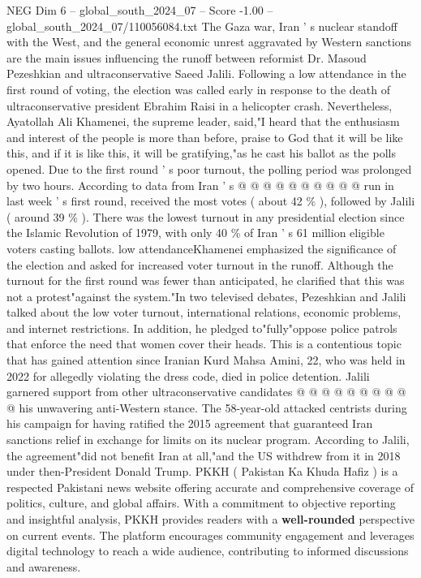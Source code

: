 \begin{textsample}{NEG Dim 6 – global\_south\_2024\_07 – Score -1.00 – global\_south\_2024\_07/110056084.txt}
The Gaza war, Iran ' s nuclear standoff with the West, and the general economic unrest aggravated by Western sanctions are the main issues influencing the runoff between reformist Dr.
Masoud Pezeshkian and ultraconservative Saeed Jalili.
Following a low attendance in the first round of voting, the election was called early in response to the death of ultraconservative president Ebrahim Raisi in a helicopter crash.
Nevertheless, Ayatollah Ali Khamenei, the supreme leader, said,"I heard that the enthusiasm and interest of the people is more than before, praise to God that it will be like this, and if it is like this, it will be gratifying,"as he cast his ballot as the polls opened.
Due to the first round ' s poor turnout, the polling period was prolonged by two hours.
According to data from Iran ' s @ @ @ @ @ @ @ @ @ @ run in last week ' s first round, received the most votes ( about 42 \% ), followed by Jalili ( around 39 \% ).
There was the lowest turnout in any presidential election since the Islamic Revolution of 1979, with only 40 \% of Iran ' s 61 million eligible voters casting ballots. low attendanceKhamenei emphasized the significance of the election and asked for increased voter turnout in the runoff.
Although the turnout for the first round was fewer than anticipated, he clarified that this was not a protest"against the system."In two televised debates, Pezeshkian and Jalili talked about the low voter turnout, international relations, economic problems, and internet restrictions.
In addition, he pledged to"fully"oppose police patrols that enforce the need that women cover their heads.
This is a contentious topic that has gained attention since Iranian Kurd Mahsa Amini, 22, who was held in 2022 for allegedly violating the dress code, died in police detention.
Jalili garnered support from other ultraconservative candidates @ @ @ @ @ @ @ @ @ @ his unwavering anti-Western stance.
The 58-year-old attacked centrists during his campaign for having ratified the 2015 agreement that guaranteed Iran sanctions relief in exchange for limits on its nuclear program.
According to Jalili, the agreement"did not benefit Iran at all,"and the US withdrew from it in 2018 under then-President Donald Trump.
PKKH ( Pakistan Ka Khuda Hafiz ) is a respected Pakistani news website offering accurate and comprehensive coverage of politics, culture, and global affairs.
With a commitment to objective reporting and insightful analysis, PKKH provides readers with a \textbf{well-rounded} perspective on current events.
The platform encourages community engagement and leverages digital technology to reach a wide audience, contributing to informed discussions and awareness.

\end{textsample}

